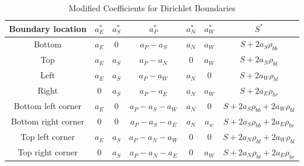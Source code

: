 \begin{table}[p]
    \caption{\label{tab:dirichletBoundaries} Modified Coefficients for Dirichlet Boundaries}
    \centering
    \begin{tabular}{c|c|c|c|c|c|c}
    \hline
    \textbf{Boundary location} & \textbf{$a_{E}^{*}$} & \textbf{$a_{S}^{*}$} & \textbf{$a_{P}^{*}$} & \textbf{$a_{N}^{*}$} & \textbf{$a_{W}^{*}$} & \textbf{$S^{*}$} \\ [0.5ex]
    \hline
    \hline
    Bottom & $a_{E}$ & $0$ & $a_{P} - a_{S}$ & $a_{N}$ & $a_{W}$ & $S + 2a_{S}\rho_{bb}$\\ \hline
    Top & $a_{E}$ & $a_{S}$ & $a_{P} - a_{N}$ & $0$ & $a_{W}$ & $S + 2a_{N}\rho_{bt}$ \\ \hline 
    Left & $a_{E}$ & $a_{S}$ & $a_{P} - a_{W}$ & $a_{N}$ & $0$ & $S + 2a_{W}\rho_{bl}$  \\ \hline
    Right & $0$ & $a_{S}$ & $a_{P} - a_{E}$ & $a_{N}$ & $a_{W}$ & $S + 2a_{E}\rho_{br}$  \\ \hline
    Bottom left corner & $a_{E}$ & $0$ & $a_{P} - a_{S} - a_{W}$ & $a_{N}$ & $0$ & $S + 2a_{S}\rho_{bb} + 2a_{W}\rho_{bl}$ \\ \hline
    Bottom right corner & $0$ & $0$ & $a_{P} - a_{S} - a_{E}$ & $a_{N}$ & $a_{w}$ & $S + 2a_{S}\rho_{bb} + 2a_{E}\rho_{br}$ \\ \hline
    Top left corner & $a_{E}$ & $a_{S}$ & $a_{P} - a_{N} - a_{W}$ & $0$ & $0$ & $S + 2a_{N}\rho_{bt} + 2a_{W}\rho_{bl}$ \\ \hline
    Top right corner & $0$ & $a_{S}$ & $a_{P} - a_{N} - a_{E}$ & $0$ & $a_{W}$ & $S + 2a_{N}\rho_{bt} + 2a_{E}\rho_{br}$ \\ \hline
    \end{tabular}
\end{table}

\clearpage

